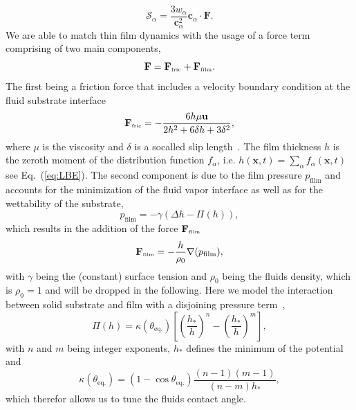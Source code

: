\documentclass[twocolumn,amsmath,amssymb,showpacs,pre,nofootinbib,superscriptaddress]{revtex4-1} %
\begin{document}
\begin{equation}\label{eq:source_term}
    \mathcal{S}_{\alpha} = \frac{3w_{\alpha}}{\mathbf{c}_{\alpha}^2}\mathbf{c}_{\alpha}\cdot\mathbf{F}.
\end{equation}
We are able to match thin film dynamics with the usage of a force term comprising of two main components,
\begin{equation}\label{eq:forcesum}
    \mathbf{F} = \mathbf{F}_{\mbox{\tiny{fric}}} + \mathbf{F}_{\mbox{\tiny{film}}}.
\end{equation}
The first being a friction force that includes a velocity boundary condition at the fluid substrate interface
\begin{equation}\label{eq:forcefric}
\mathbf{F}_{\mbox{\tiny{fric}}} = -\frac{6h\mu\mathbf{u}}{2h^2+6\delta h + 3\delta^2},
\end{equation}
where $\mu$ is the viscosity and $\delta$ is a socalled slip length~\cite{RevModPhys.69.931, PhysRevE.100.033313, PhysRevE.63.011208, munch_lubrication_2005}.
The film thickness $h$ is the zeroth moment of the distribution function $f_{\alpha}$, i.e. $h(\mathbf{x},t) = \sum_{\alpha}f_{\alpha}(\mathbf{x},t)$ see Eq.~(\ref{eq:LBE}). 
The second component is due to the film pressure $p_{\text{film}}$ and accounts for the minimization of the fluid vapor interface as well as for the wettability of the substrate,
\begin{equation}\label{eq:pressure_here}
    p_{\text{film}} = -\gamma (\Delta h - \Pi(h)),
\end{equation}
which results in the addition of the force $\mathbf{F}_{\mbox{\tiny{film}}}$
\begin{equation}\label{eq:forcefilm}
    \mathbf{F}_{\mbox{\tiny{film}}} = -\frac{h}{\rho_0}\nabla(p_{\text{film}}), 
\end{equation}
with $\gamma$ being the (constant) surface tension and $\rho_0$ being the fluids density, which is $\rho_0 = 1$ and will be dropped in the following. 
Here we model the interaction between solid substrate and film with a disjoining pressure term~\cite{RevModPhys.69.931, RevModPhys.81.1131, PhysRevE.63.011208},
\begin{equation}\label{eq:disjoinpressure}
    \Pi(h) = \kappa(\theta_{\text{eq.}})\left[\left(\frac{h_{\ast}}{h}\right)^n - \left(\frac{h_{\ast}}{h}\right)^m\right],
\end{equation}
with $n$ and $m$ being integer exponents, $h_{\ast}$ defines the minimum of the potential and  
\begin{equation}\label{eq:kappacontactangle}
    \kappa(\theta_{\text{eq.}}) = (1-\cos\theta_{\text{eq.}}) \frac{(n-1)(m-1)}{(n-m)h_{\ast}},
\end{equation}
which therefor allows us to tune the fluids contact angle.
\end{document}
